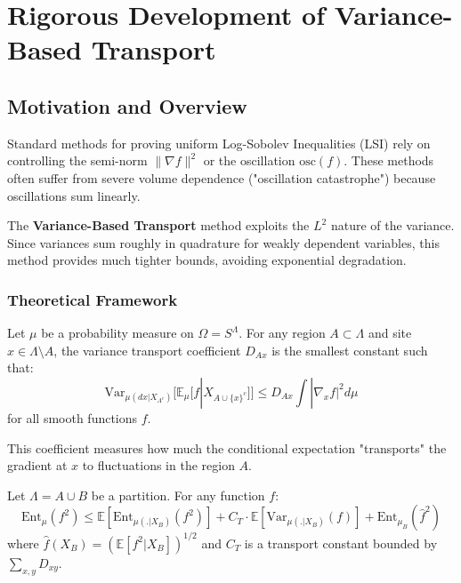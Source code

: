 \chapter{Rigorous Development of Variance-Based Transport}
\label{ch:variance_transport_rigorous}


\section{Motivation and Overview}

Standard methods for proving uniform Log-Sobolev Inequalities (LSI) rely on controlling the semi-norm $\| \nabla f \|^2$ or the oscillation $\text{osc}(f)$. These methods often suffer from severe volume dependence ("oscillation catastrophe") because oscillations sum linearly.

The \textbf{Variance-Based Transport} method exploits the $L^2$ nature of the variance. Since variances sum roughly in quadrature for weakly dependent variables, this method provides much tighter bounds, avoiding exponential degradation.

\subsection{Theoretical Framework}

\begin{definition}
Let $\mu$ be a probability measure on $\Omega = S^\Lambda$. For any region $A \subset \Lambda$ and site $x \in \Lambda \setminus A$, the variance transport coefficient $D_{Ax}$ is the smallest constant such that:
\begin{equation}
\text{Var}_{\mu(dx|X_{A^c})} [ \mathbb{E}_\mu [f | X_{A \cup \{x\}^c}] ] \leq D_{Ax} \int |\nabla_x f|^2 d\mu
\end{equation}
for all smooth functions $f$.
\end{definition}

This coefficient measures how much the conditional expectation "transports" the gradient at $x$ to fluctuations in the region $A$.

\begin{theorem}
\label{thm:variance_decomposition}
Let $\Lambda = A \cup B$ be a partition. For any function $f$:
\begin{equation}
\text{Ent}_\mu(f^2) \leq \mathbb{E}[\text{Ent}_{\mu(.|X_B)}(f^2)] + C_T \cdot \mathbb{E}[\text{Var}_{\mu(.|X_B)}(f)] + \text{Ent}_{\mu_B}(\hat{f}^2)
\end{equation}
where $\hat{f}(X_B) = (\mathbb{E}[f^2 | X_B])^{1/2}$ and $C_T$ is a transport constant bounded by $\sum_{x,y} D_{xy}$.
\end{theorem}


